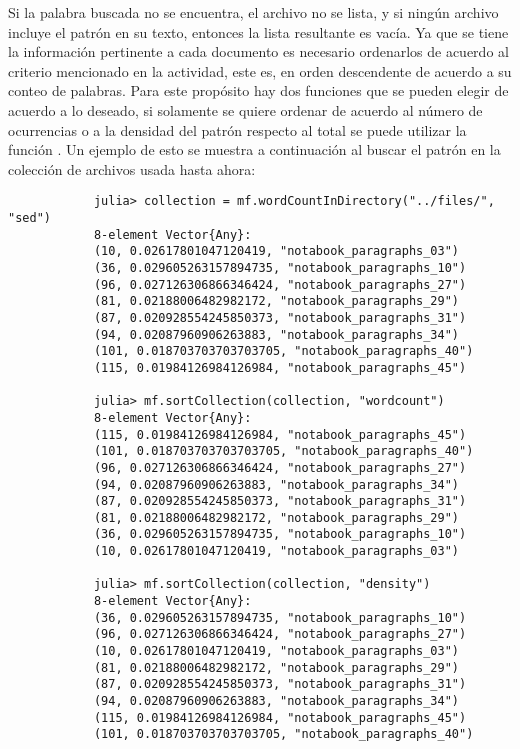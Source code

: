 \begin{itemize}
\begin{solution}
        Si la palabra buscada no se encuentra, el archivo no se lista, y si ningún archivo incluye el patrón en su texto, entonces la lista resultante es vacía. Ya que se tiene la información pertinente a cada documento es necesario ordenarlos de acuerdo al criterio mencionado en la actividad, este es, en orden descendente de acuerdo a su conteo de palabras. Para este propósito hay dos funciones que se pueden elegir de acuerdo a lo deseado, si solamente se quiere ordenar de acuerdo al número de ocurrencias o a la densidad del patrón respecto al total se puede utilizar la función . Un ejemplo de esto se muestra a continuación al buscar el patrón  en la colección de archivos usada hasta ahora:
        \begin{verbatim}
            julia> collection = mf.wordCountInDirectory("../files/", "sed")
            8-element Vector{Any}:
            (10, 0.02617801047120419, "notabook_paragraphs_03")
            (36, 0.029605263157894735, "notabook_paragraphs_10")
            (96, 0.027126306866346424, "notabook_paragraphs_27")
            (81, 0.02188006482982172, "notabook_paragraphs_29")
            (87, 0.020928554245850373, "notabook_paragraphs_31")
            (94, 0.02087960906263883, "notabook_paragraphs_34")
            (101, 0.018703703703703705, "notabook_paragraphs_40")
            (115, 0.01984126984126984, "notabook_paragraphs_45")

            julia> mf.sortCollection(collection, "wordcount")
            8-element Vector{Any}:
            (115, 0.01984126984126984, "notabook_paragraphs_45")
            (101, 0.018703703703703705, "notabook_paragraphs_40")
            (96, 0.027126306866346424, "notabook_paragraphs_27")
            (94, 0.02087960906263883, "notabook_paragraphs_34")
            (87, 0.020928554245850373, "notabook_paragraphs_31")
            (81, 0.02188006482982172, "notabook_paragraphs_29")
            (36, 0.029605263157894735, "notabook_paragraphs_10")
            (10, 0.02617801047120419, "notabook_paragraphs_03")

            julia> mf.sortCollection(collection, "density")
            8-element Vector{Any}:
            (36, 0.029605263157894735, "notabook_paragraphs_10")
            (96, 0.027126306866346424, "notabook_paragraphs_27")
            (10, 0.02617801047120419, "notabook_paragraphs_03")
            (81, 0.02188006482982172, "notabook_paragraphs_29")
            (87, 0.020928554245850373, "notabook_paragraphs_31")
            (94, 0.02087960906263883, "notabook_paragraphs_34")
            (115, 0.01984126984126984, "notabook_paragraphs_45")
            (101, 0.018703703703703705, "notabook_paragraphs_40")
        \end{verbatim}
        

\end{solution}
\end{itemize}
